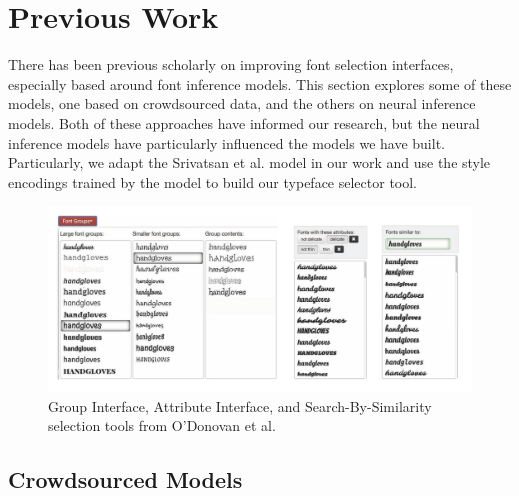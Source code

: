 \section{Previous Work}

There has been previous scholarly on improving font selection interfaces, especially based around font inference models. This section explores some of these models, one based on crowdsourced data, and the others on neural inference models. Both of these approaches have informed our research, but the neural inference models have particularly influenced the models we have built. Particularly, we adapt the Srivatsan et al. model \cite{srivatsan2020} in our work and use the style encodings trained by the model to build our typeface selector tool.

\begin{figure}
    \centering
    \includegraphics[width=1\textwidth]{images/odonovan-interfaces.png}
    \caption{Group Interface, Attribute Interface, and Search-By-Similarity selection tools from O'Donovan et al. \cite{odonovan2014}}
    \label{fig:odonovan-interfaces}
\end{figure}

\subsection{Crowdsourced Models}

